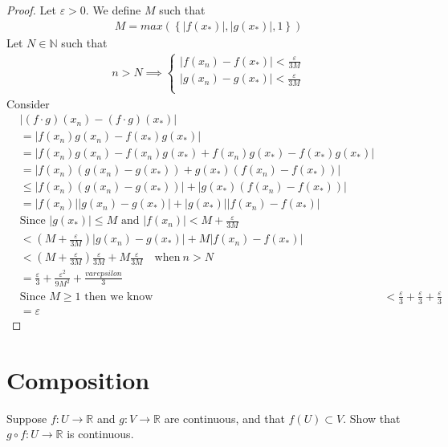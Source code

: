 \documentclass[12pt]{amsart}
\newcommand{\R}{\mathbb{R}}
\newcommand{\N}{\mathbb{N}}
\begin{document}
\begin{proof}
  Let $\varepsilon>0$. We define $M$ such that
  \begin{align*}
    M=max\left(\left\{|f(x_\ast)|,|g(x_\ast)|,1\right\}\right)
  \end{align*}
  Let $N\in\N$ such that
  \begin{align*}
    n>N\implies\begin{cases}
      |f(x_n)-f(x_\ast)|<\frac{\varepsilon}{3M}\\
      |g(x_n)-g(x_\ast)|<\frac{\varepsilon}{3M}\\
    \end{cases}
  \end{align*}
  Consider
  \begin{align*}
    &|(f \cdot g)(x_n)-(f \cdot g)(x_\ast)|\\
    &=|f(x_n)g(x_n)-f(x_\ast)g(x_\ast)|\\
    &=|f(x_n)g(x_n)-f(x_n)g(x_\ast)+f(x_n)g(x_\ast)-f(x_\ast)g(x_\ast)|\\
    &=|f(x_n)(g(x_n)-g(x_\ast))+g(x_\ast)(f(x_n)-f(x_\ast))|\\
    &\leq|f(x_n)(g(x_n)-g(x_\ast))|+|g(x_\ast)(f(x_n)-f(x_\ast))|\\
    &=|f(x_n)||g(x_n)-g(x_\ast)|+|g(x_\ast)||f(x_n)-f(x_\ast)|\\
    &\text{Since $|g(x_\ast)|\leq M$ and $|f(x_n)|<M+\frac{\varepsilon}{3M}$}\\
    &<\left(M+\frac{\varepsilon}{3M}\right)|g(x_n)-g(x_\ast)|+M|f(x_n)-f(x_\ast)|\\
    &<\left(M+\frac{\varepsilon}{3M}\right)\frac{\varepsilon}{3M}+M\frac{\varepsilon}{3M}\quad\text{when}\
    n>N\\
    &=\frac{\varepsilon}{3}+\frac{\varepsilon^2}{9M^2}+\frac{varepsilon}{3}\\
    &\text{Since $M\geq 1$ then we know }
    &<\frac{\varepsilon}{3}+\frac{\varepsilon}{3}+\frac{\varepsilon}{3}\\
    &=\varepsilon
  \end{align*}
\end{proof}

\section{Composition}%
\label{sec:composition}

Suppose $f:U\rightarrow\R$ and $g:V\rightarrow\R$ are continuous, and that
$f(U)\subset V$. Show that $g\circ f:U\rightarrow\R$ is continuous.
\end{document}
